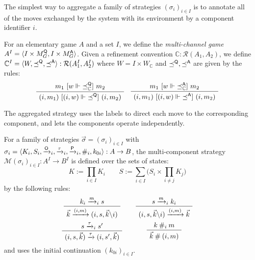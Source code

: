 The simplest way to aggregate a family of strategies $(\sigma_i)_{i\in I}$
is to annotate all of the moves exchanged by the system with its environment
by a component identifier $i$.

\begin{definition} %
For an elementary game $A$ and a set $I$,
we define the \emph{multi-channel game}
$A^I = \langle I \times M_G^{ \mathsf{Q} }, I \times M_G^{ \mathsf{A} } \rangle$.
Given a refinement convention
$\mathbb{C} : \mathcal{R}(A_1, A_2)$,
we define
$\mathbb{C}^I =
 \langle W, {\preceq}^{ \mathsf{Q} }, {\preceq}^{ \mathsf{A} } \rangle :
 \mathcal{R}(A_1^I, A_2^I)$
where
$W = I \times W_\mathbb{C}$ and
$\preceq^{ \mathsf{Q} }, \preceq^{ \mathsf{A} }$
are given by the rules:
\[
    \small
    \AxiomC{$m_1 \ifr{w \Vdash {\preceq}_\mathbb{C}^\kw{Q}} m_2$}
    \UnaryInfC{$(i, m_1) \ifr{(i, w) \Vdash {\preceq}^\kw{Q}} (i, m_2)$}
    \DisplayProof
    \quad
    \AxiomC{$m_1 \ifr{w \Vdash {\preceq}_\mathbb{C}^\kw{A}} m_2$}
    \UnaryInfC{$(i, m_1) \ifr{(i, w) \Vdash {\preceq}^\kw{A}} (i, m_2)$}
    \DisplayProof
\]
\end{definition}

The aggregated strategy uses the labels to direct each move
to the corresponding component,
and lets the components operate independently.

\begin{definition} %
For a family of strategies
$\vec{\sigma} = (\sigma_i)_{i \in I}$
with
$\sigma_i = \langle K_i, S_i, \xrightarrow{ \mathsf{O} }_i,
  \xrightarrow{\tau}_i, \xrightarrow{ \mathsf{P} }_i, \#_i, k_{0i} \rangle :
  A \rightarrow B$,
the multi-component strategy
$\mathcal{M}(\sigma_i)_{i \in I} : A^I \rightarrow B^I$
is defined over the sets of states:
\[
  K := \prod_{i \in I} K_i \qquad
  S := \sum_{i \in I}
    \Big( S_i \times \prod_{i \ne j} K_j \Big)
\]
by the following rules:
\[
  \begin{array}{c@{\qquad}c}
    \AxiomC{$k_i \xrightarrow{m}_i s$}
    \UnaryInfC{$\vec{k} \xrightarrow{(i, m)} (i, s, \vec{k} \backslash i)$}
    \DisplayProof
    &
    \AxiomC{$s \xrightarrow{m}_i k_i$}
    \UnaryInfC{$(i, s, \vec{k} \backslash i) \xrightarrow{(i, m)} \vec{k}$}
    \DisplayProof
    \\[1.5em]
    \AxiomC{$s \xrightarrow{\tau}_i s'$}
    \UnaryInfC{$(i, s, \vec{k}) \xrightarrow{\tau} (i, s', \vec{k})$}
    \DisplayProof
    &
    \AxiomC{$k \: \#_i \: m$}
    \UnaryInfC{$\vec{k} \: \# \: (i, m)$}
    \DisplayProof
  \end{array}
\]
and uses the initial continuation $(k_{0i})_{i \in I}$.
\end{definition}


